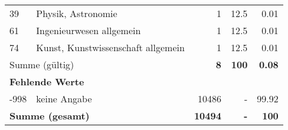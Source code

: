 \begin{longtable}{lXrrr}
     39 &
     \multicolumn{1}{X}{ Physik, Astronomie   } &


       \num{1} &
       \num[round-mode=places,round-precision=2]{12,5} &
         \num[round-mode=places,round-precision=2]{0,01} \\

     61 &
     \multicolumn{1}{X}{ Ingenieurwesen allgemein   } &


       \num{1} &
       \num[round-mode=places,round-precision=2]{12,5} &
         \num[round-mode=places,round-precision=2]{0,01} \\

     74 &
     \multicolumn{1}{X}{ Kunst, Kunstwissenschaft allgemein   } &


       \num{1} &
       \num[round-mode=places,round-precision=2]{12,5} &
         \num[round-mode=places,round-precision=2]{0,01} \\
     \midrule
     \multicolumn{2}{l}{Summe (gültig)} &
       \textbf{\num{8}} &
     \textbf{100} &
       \textbf{\num[round-mode=places,round-precision=2]{0,08}} \\
     \multicolumn{5}{l}{\textbf{Fehlende Werte}}\\
       -998 &
       keine Angabe &
         \num{10486} &
        - &
         \num[round-mode=places,round-precision=2]{99,92} \\
     \midrule
     \multicolumn{2}{l}{\textbf{Summe (gesamt)}} &
          \textbf{\num{10494}} &
        \textbf{-} &
        \textbf{100} \\
     \bottomrule
     \end{longtable}
     

